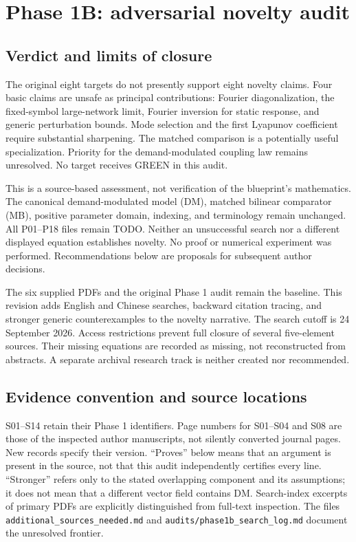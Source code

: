 \section{Phase 1B: adversarial novelty audit}
\label{sec:adversarial-audit}

\subsection{Verdict and limits of closure}
The original eight targets do not presently support eight novelty claims.
Four basic claims are unsafe as principal contributions: Fourier diagonalization,
the fixed-symbol large-network limit, Fourier inversion for static response,
and generic perturbation bounds. Mode selection and the first Lyapunov
coefficient require substantial sharpening. The matched comparison is a
potentially useful specialization. Priority for the demand-modulated coupling
law remains unresolved. No target receives GREEN in this audit.

This is a source-based assessment, not verification of the blueprint's mathematics.
The canonical demand-modulated model (DM), matched bilinear comparator (MB),
positive parameter domain, indexing, and terminology remain unchanged.
All P01--P18 files remain TODO. Neither an unsuccessful search nor a different
displayed equation establishes novelty. No proof or numerical experiment was
performed. Recommendations below are proposals for subsequent author decisions.

The six supplied PDFs and the original Phase 1 audit remain the baseline.
This revision adds English and Chinese searches, backward citation tracing,
and stronger generic counterexamples to the novelty narrative.
The search cutoff is 24 September 2026. Access restrictions prevent full
closure of several five-element sources. Their missing equations are recorded
as missing, not reconstructed from abstracts. A separate archival research
track is neither created nor recommended.

\subsection{Evidence convention and source locations}
S01--S14 retain their Phase 1 identifiers. Page numbers for S01--S04 and
S08 are those of the inspected author manuscripts, not silently converted
journal pages. New records specify their version. ``Proves'' below means
that an argument is present in the source, not that this audit independently
certifies every line. ``Stronger'' refers only to the stated overlapping
component and its assumptions; it does not mean that a different vector field
contains DM. Search-index excerpts of primary PDFs are explicitly distinguished
from full-text inspection. The files \texttt{additional\_sources\_needed.md}
and \texttt{audits/phase1b\_search\_log.md} document the unresolved frontier.

